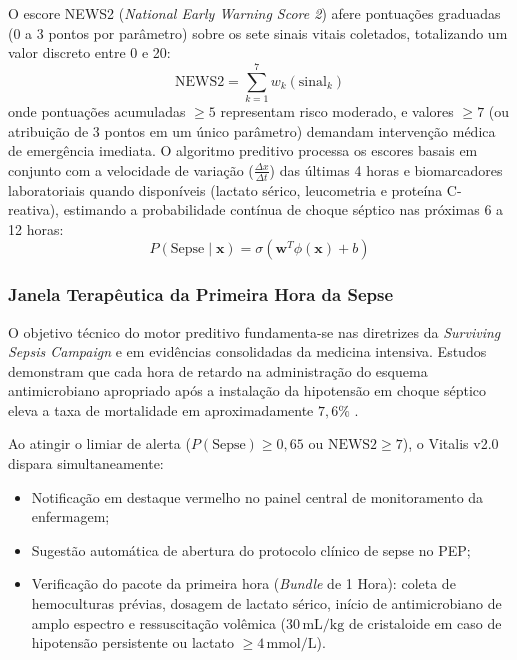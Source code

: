 O escore NEWS2 (\textit{National Early Warning Score 2}) afere pontuações graduadas (0 a 3 pontos por parâmetro) sobre os sete sinais vitais coletados, totalizando um valor discreto entre 0 e 20:
\begin{equation}
    \text{NEWS2} = \sum_{k=1}^7 w_k(\text{sinal}_k)
\end{equation}
onde pontuações acumuladas $\ge 5$ representam risco moderado, e valores $\ge 7$ (ou atribuição de 3 pontos em um único parâmetro) demandam intervenção médica de emergência imediata. O algoritmo preditivo processa os escores basais em conjunto com a velocidade de variação ($\frac{\Delta x}{\Delta t}$) das últimas 4 horas e biomarcadores laboratoriais quando disponíveis (lactato sérico, leucometria e proteína C-reativa), estimando a probabilidade contínua de choque séptico nas próximas 6 a 12 horas:
\begin{equation}
    P(\text{Sepse} \mid \mathbf{x}) = \sigma\left(\mathbf{w}^T \phi(\mathbf{x}) + b\right)
\end{equation}

\subsubsection{Janela Terapêutica da Primeira Hora da Sepse}
O objetivo técnico do motor preditivo fundamenta-se nas diretrizes da \textit{Surviving Sepsis Campaign} e em evidências consolidadas da medicina intensiva. Estudos demonstram que cada hora de retardo na administração do esquema antimicrobiano apropriado após a instalação da hipotensão em choque séptico eleva a taxa de mortalidade em aproximadamente $7{,}6\%$ \cite{kumar_sepsis:2006}.

Ao atingir o limiar de alerta ($P(\text{Sepse}) \ge 0{,}65$ ou $\text{NEWS2} \ge 7$), o Vitalis v2.0 dispara simultaneamente:
\begin{itemize}[noitemsep]
    \item Notificação em destaque vermelho no painel central de monitoramento da enfermagem;
    \item Sugestão automática de abertura do protocolo clínico de sepse no PEP;
    \item Verificação do pacote da primeira hora (\textit{Bundle} de 1 Hora): coleta de hemoculturas prévias, dosagem de lactato sérico, início de antimicrobiano de amplo espectro e ressuscitação volêmica ($30\,\text{mL/kg}$ de cristaloide em caso de hipotensão persistente ou lactato $\ge 4\,\text{mmol/L}$).
\end{itemize}

